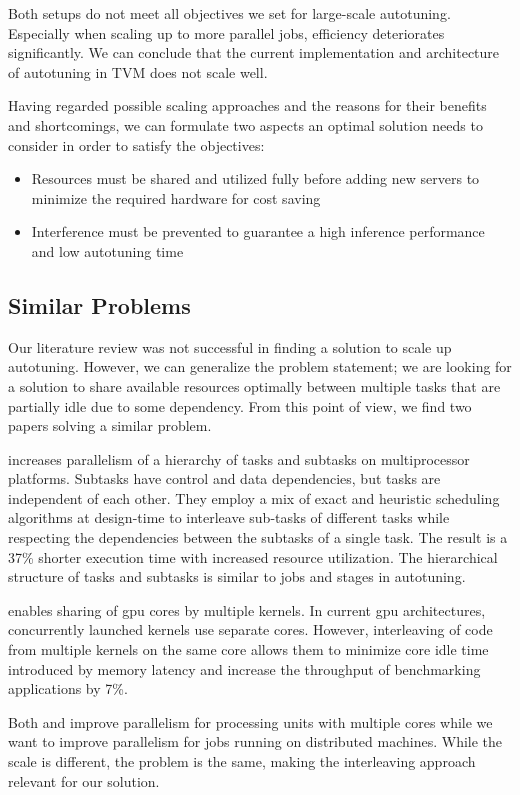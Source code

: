 Both setups do not meet all objectives we set for large-scale autotuning. Especially when scaling up to more parallel jobs, efficiency deteriorates significantly. We can conclude that the current implementation and architecture of autotuning in TVM does not scale well.

Having regarded possible scaling approaches and the reasons for their benefits and shortcomings, we can formulate two aspects an optimal solution needs to consider in order to satisfy the objectives:
\begin{itemize}
	\item Resources must be shared and utilized fully before adding new servers to minimize the required hardware for cost saving
	\item Interference must be prevented to guarantee a high inference performance and low autotuning time
\end{itemize}

\subsection{Similar Problems}
Our literature review was not successful in finding a solution to scale up autotuning. However, we can generalize the problem statement; we are looking for a solution to share available resources optimally between multiple tasks that are partially idle due to some dependency. From this point of view, we find two papers solving a similar problem.

\cite{Ma.2005} increases parallelism of a hierarchy of tasks and subtasks on multiprocessor platforms. Subtasks have control and data dependencies, but tasks are independent of each other. They employ a mix of exact and heuristic scheduling algorithms at design-time to interleave sub-tasks of different tasks while respecting the dependencies between the subtasks of a single task. The result is a 37\% shorter execution time with increased resource utilization. The hierarchical structure of tasks and subtasks is similar to jobs and stages in autotuning.

\cite{Awatramani.2013} enables sharing of \gls{gpu} cores by multiple kernels. In current \gls{gpu} architectures, concurrently launched kernels use separate cores. However, interleaving of code from multiple kernels on the same core allows them to minimize core idle time introduced by memory latency and increase the throughput of benchmarking applications by 7\%.

Both \cite{Ma.2005} and \cite{Awatramani.2013} improve parallelism for processing units with multiple cores while we want to improve parallelism for jobs running on distributed machines. While the scale is different, the problem is the same, making the interleaving approach relevant for our solution.